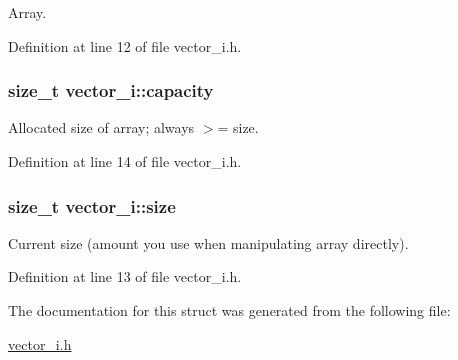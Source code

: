 Array. 



Definition at line 12 of file vector\-\_\-i.\-h.

\hypertarget{structvector__i_a8e7421832635519ee2ccebd19298b705}{
\subsubsection[{capacity}]{\setlength{\rightskip}{0pt plus 5cm}size\-\_\-t vector\-\_\-i\-::capacity}}\label{structvector__i_a8e7421832635519ee2ccebd19298b705}


Allocated size of array; always $>$= size. 



Definition at line 14 of file vector\-\_\-i.\-h.

\hypertarget{structvector__i_a8df52068982f4b7dcaa024b37f243282}{
\subsubsection[{size}]{\setlength{\rightskip}{0pt plus 5cm}size\-\_\-t vector\-\_\-i\-::size}}\label{structvector__i_a8df52068982f4b7dcaa024b37f243282}


Current size (amount you use when manipulating array directly). 



Definition at line 13 of file vector\-\_\-i.\-h.



The documentation for this struct was generated from the following file\-:\begin{DoxyCompactItemize}
\item 
\hyperlink{vector__i_8h}{vector\-\_\-i.\-h}\end{DoxyCompactItemize}
